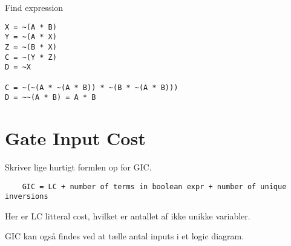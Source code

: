 \begin{opg}
    Find expression
\end{opg}

\begin{verbatim}
X = ~(A * B)
Y = ~(A * X)
Z = ~(B * X)
C = ~(Y * Z)
D = ~X

C = ~(~(A * ~(A * B)) * ~(B * ~(A * B)))
D = ~~(A * B) = A * B
\end{verbatim}


\section{Gate Input Cost}

Skriver lige hurtigt formlen op for GIC.
\begin{verbatim}
    GIC = LC + number of terms in boolean expr + number of unique inversions
\end{verbatim}
Her er LC litteral cost, hvilket er antallet af ikke unikke variabler.

GIC kan også findes ved at tælle antal inputs i et logic diagram.
